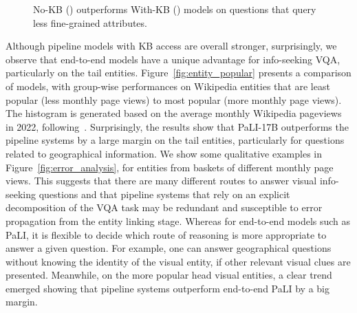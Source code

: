 \documentclass[11pt]{article}
\begin{document}
\begin{figure}[t]
    \centering
\caption{No-KB () outperforms With-KB () models on questions that query less fine-grained attributes.}
\label{fig:question_relation}
\end{figure}
 
Although pipeline models with KB access are overall stronger, surprisingly, we observe that end-to-end models have a unique advantage for info-seeking VQA, particularly on the tail entities. 
Figure~\ref{fig:entity_popular} presents a comparison of models, with group-wise performances on Wikipedia entities that are least popular (less monthly page views) to most popular (more monthly page views). The histogram is generated based on the average monthly Wikipedia pageviews in 2022, following~\cite{mallen2022not}.
Surprisingly, the results show that PaLI-17B outperforms the pipeline systems by a large margin on the tail entities, particularly for questions related to geographical information. We show some qualitative examples in Figure~\ref{fig:error_analysis}, for entities from baskets of different monthly page views. 
This suggests that there are many different routes to answer visual info-seeking questions and that pipeline systems that rely on an explicit decomposition of the VQA task may be redundant and susceptible to error propagation from the entity linking stage.
Whereas for end-to-end models such as PaLI, it is flexible to decide which route of reasoning is more appropriate to answer a given question. For example, one can answer geographical questions without knowing the identity of the visual entity, if other relevant visual clues are presented.
Meanwhile, on the more popular head visual entities, a clear trend emerged showing that pipeline systems outperform end-to-end PaLI by a big margin.
\end{document}
